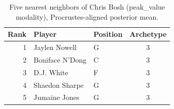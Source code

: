 \begin{table}[htbp]
  \centering\small
  \begin{tabular}{rllc}
    \toprule
    Rank & Player & Position & Archetype \\
    \midrule
    1 & Jaylen Nowell & G & 3 \\
    2 & Boniface N'Dong & C & 3 \\
    3 & D.J. White & F & 3 \\
    4 & Shaedon Sharpe & G & 3 \\
    5 & Jumaine Jones & G & 3 \\
    \bottomrule
  \end{tabular}
  \caption{Five nearest neighbors of Chris Bosh (peak_value modality), Procrustes-aligned posterior mean.}
  \label{tab:Chris_Bosh_neighbors_peak_value}
\end{table}

